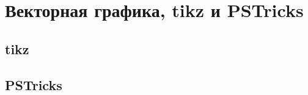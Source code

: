 \section[Векторная графика]{Векторная графика, tikz и  PSTricks}

\subsection{tikz}
	

\subsection{PSTricks}	
	
	
\pagebreak %
